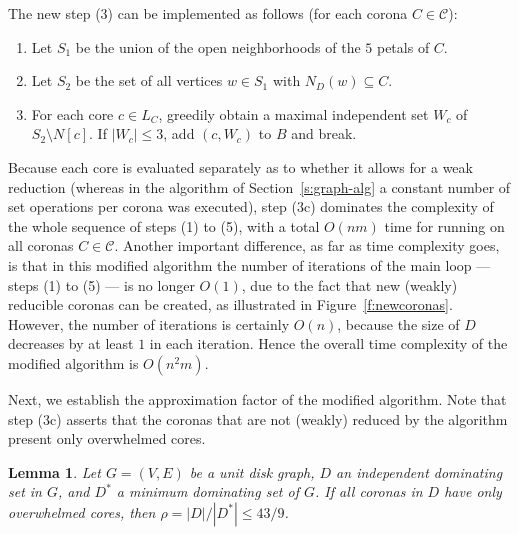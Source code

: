 \documentclass[preprint,12pt]{elsarticle}
\newtheorem{lem}[thm]{Lemma}
\newcommand{\CC}{\mathcal{C}}
\begin{document}
The new step (3) can be implemented as follows (for each corona $C \in \CC$):

\begin{enumerate}[(3a)]
\item Let $S_1$ be the union of the open neighborhoods of the $5$ petals of $C$.

\item Let $S_2$ be the set of all vertices $w \in S_1$ with $N_D(w) \subseteq C$.

\item For each core $c \in L_C$, greedily obtain a maximal independent set $W_c$ of $S_2 \setminus N[c]$. If $|W_c| \leq 3$, add $(c, W_c)$ to $B$ and break.
\end{enumerate}

Because each core is evaluated separately as to whether it allows for a weak reduction (whereas in the algorithm of Section~\ref{s:graph-alg} a constant number of set operations per corona was executed), step (3c) dominates the complexity of the whole sequence of steps (1) to (5), with a total $O(nm)$ time for running on all coronas $C \in \CC$. Another important difference, as far as time complexity goes, is that in this modified algorithm the number of iterations of the main loop --- steps (1) to (5) --- is no longer $O(1)$, due to the fact that new (weakly) reducible coronas can be created, as illustrated in Figure~\ref{f:newcoronas}. However, the number of iterations is certainly $O(n)$, because the size \linebreak of $D$ decreases by at least $1$ in each iteration. Hence the overall time complexity of the modified algorithm is $O(n^2 m)$.

Next, we establish the approximation factor of the modified algorithm. Note that step (3c) asserts that the coronas that are not (weakly) reduced by the algorithm present only overwhelmed cores.

\begin{lem} \label{l:irreducible_partial}
Let $G = (V,E)$ be a unit disk graph, $D$ an independent dominating set in $G$, and $D^*$ a minimum dominating set of $G$. If all coronas \linebreak in $D$ have only overwhelmed cores, then $\rho = |D|/|D^*| \leq 43/9$.
\end{lem}
\end{document}
